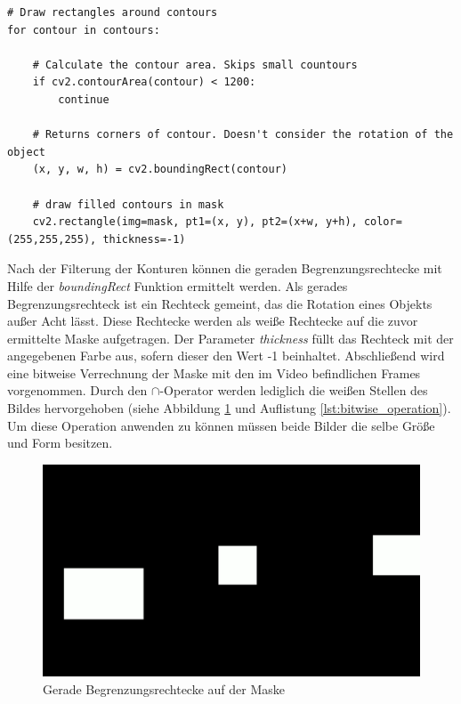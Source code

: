 \vspace*{10mm}
\begin{lstlisting}[caption={Erstellen einer Konturenmaske}, label={lst:contourmask}]
# Draw rectangles around contours
for contour in contours:
            
    # Calculate the contour area. Skips small countours
    if cv2.contourArea(contour) < 1200:
        continue
                
    # Returns corners of contour. Doesn't consider the rotation of the object
    (x, y, w, h) = cv2.boundingRect(contour)
                        
    # draw filled contours in mask
    cv2.rectangle(img=mask, pt1=(x, y), pt2=(x+w, y+h), color=(255,255,255), thickness=-1)
\end{lstlisting}

Nach der Filterung der Konturen können die geraden Begrenzungsrechtecke mit Hilfe der \emph{boundingRect} Funktion ermittelt werden. Als gerades Begrenzungsrechteck ist ein Rechteck gemeint, das die Rotation eines Objekts außer Acht lässt. Diese Rechtecke werden als weiße Rechtecke auf die zuvor ermittelte Maske aufgetragen. Der Parameter \emph{thickness} füllt das Rechteck mit der angegebenen Farbe aus, sofern dieser den Wert -1 beinhaltet. Abschließend wird eine bitweise Verrechnung der Maske mit den im Video befindlichen Frames vorgenommen. Durch den $\cap$-Operator werden lediglich die weißen Stellen des Bildes hervorgehoben (siehe Abbildung \ref{fig:abbildungmask} und Auflistung \ref{lst:bitwise_operation}). Um diese Operation anwenden zu können müssen beide Bilder die selbe Größe und Form besitzen.

\begin{figure}[htb]
	\centering
	\includegraphics[width=.9\textwidth]{images/abbildung_mask}
	\caption{Gerade Begrenzungsrechtecke auf der Maske}
	\label{fig:abbildungmask}
\end{figure}

